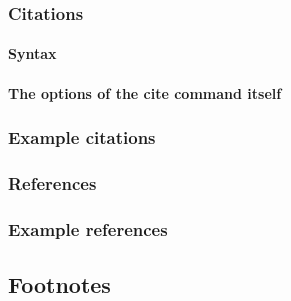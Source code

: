 \documentclass[%
reprint,
amsmath,amssymb,
aps,
floatfix,
]{revtex4-2}
\begin{document}
	
	\subsubsection{Citations}
	
	
	\paragraph{Syntax}
	
	
	\paragraph{The options of the cite command itself}
	
	
	\subsubsection{Example citations}
	
	
	\subsubsection{References}
	
	
	\subsubsection{Example references}
	
	
	
	
	\subsection{Footnotes}%
	
\end{document}
